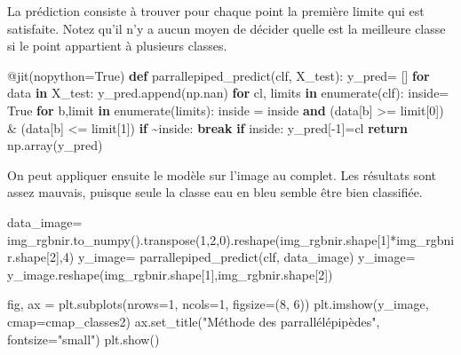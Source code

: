 \documentclass[
  11pt,
  letterpaper,
  open=any,
  twoside=false,
  french]{scrbook}
\newenvironment{Shaded}{\begin{snugshade}}{\end{snugshade}}
\newcommand{\AttributeTok}[1]{\textcolor[rgb]{0.40,0.45,0.13}{#1}}
\newcommand{\BuiltInTok}[1]{\textcolor[rgb]{0.00,0.23,0.31}{#1}}
\newcommand{\ControlFlowTok}[1]{\textcolor[rgb]{0.00,0.23,0.31}{\textbf{#1}}}
\newcommand{\DecValTok}[1]{\textcolor[rgb]{0.68,0.00,0.00}{#1}}
\newcommand{\KeywordTok}[1]{\textcolor[rgb]{0.00,0.23,0.31}{\textbf{#1}}}
\newcommand{\NormalTok}[1]{\textcolor[rgb]{0.00,0.23,0.31}{#1}}
\newcommand{\OperatorTok}[1]{\textcolor[rgb]{0.37,0.37,0.37}{#1}}
\newcommand{\StringTok}[1]{\textcolor[rgb]{0.13,0.47,0.30}{#1}}
\newcommand{\VariableTok}[1]{\textcolor[rgb]{0.07,0.07,0.07}{#1}}
\begin{document}
La prédiction consiste à trouver pour chaque point la première limite
qui est satisfaite. Notez qu'il n'y a aucun moyen de décider quelle est
la meilleure classe si le point appartient à plusieurs classes.

\begin{Shaded}
\begin{Highlighting}[]
\AttributeTok{@jit}\NormalTok{(nopython}\OperatorTok{=}\VariableTok{True}\NormalTok{)}
\KeywordTok{def}\NormalTok{ parrallepiped\_predict(clf, X\_test):}
\NormalTok{  y\_pred}\OperatorTok{=}\NormalTok{ []}
  \ControlFlowTok{for}\NormalTok{ data }\KeywordTok{in}\NormalTok{ X\_test:}
\NormalTok{    y\_pred.append(np.nan)}
    \ControlFlowTok{for}\NormalTok{ cl, limits }\KeywordTok{in} \BuiltInTok{enumerate}\NormalTok{(clf):}
\NormalTok{      inside}\OperatorTok{=} \VariableTok{True}
      \ControlFlowTok{for}\NormalTok{ b,limit }\KeywordTok{in} \BuiltInTok{enumerate}\NormalTok{(limits):}
\NormalTok{        inside }\OperatorTok{=}\NormalTok{ inside }\KeywordTok{and}\NormalTok{ (data[b] }\OperatorTok{\textgreater{}=}\NormalTok{ limit[}\DecValTok{0}\NormalTok{]) }\OperatorTok{\&}\NormalTok{ (data[b] }\OperatorTok{\textless{}=}\NormalTok{ limit[}\DecValTok{1}\NormalTok{])}
        \ControlFlowTok{if} \OperatorTok{\textasciitilde{}}\NormalTok{inside:}
          \ControlFlowTok{break}
      \ControlFlowTok{if}\NormalTok{ inside:}
\NormalTok{        y\_pred[}\OperatorTok{{-}}\DecValTok{1}\NormalTok{]}\OperatorTok{=}\NormalTok{cl}
  \ControlFlowTok{return}\NormalTok{ np.array(y\_pred)}
\end{Highlighting}
\end{Shaded}

On peut appliquer ensuite le modèle sur l'image au complet. Les
résultats sont assez mauvais, puisque seule la classe eau en bleu semble
être bien classifiée.

\begin{Shaded}
\begin{Highlighting}[]
\NormalTok{data\_image}\OperatorTok{=}\NormalTok{ img\_rgbnir.to\_numpy().transpose(}\DecValTok{1}\NormalTok{,}\DecValTok{2}\NormalTok{,}\DecValTok{0}\NormalTok{).reshape(img\_rgbnir.shape[}\DecValTok{1}\NormalTok{]}\OperatorTok{*}\NormalTok{img\_rgbnir.shape[}\DecValTok{2}\NormalTok{],}\DecValTok{4}\NormalTok{)}
\NormalTok{y\_image}\OperatorTok{=}\NormalTok{ parrallepiped\_predict(clf, data\_image)}
\NormalTok{y\_image}\OperatorTok{=}\NormalTok{ y\_image.reshape(img\_rgbnir.shape[}\DecValTok{1}\NormalTok{],img\_rgbnir.shape[}\DecValTok{2}\NormalTok{])}

\NormalTok{fig, ax }\OperatorTok{=}\NormalTok{ plt.subplots(nrows}\OperatorTok{=}\DecValTok{1}\NormalTok{, ncols}\OperatorTok{=}\DecValTok{1}\NormalTok{, figsize}\OperatorTok{=}\NormalTok{(}\DecValTok{8}\NormalTok{, }\DecValTok{6}\NormalTok{))}
\NormalTok{plt.imshow(y\_image, cmap}\OperatorTok{=}\NormalTok{cmap\_classes2)}
\NormalTok{ax.set\_title(}\StringTok{"Méthode des parrallélépipèdes"}\NormalTok{, fontsize}\OperatorTok{=}\StringTok{"small"}\NormalTok{)}
\NormalTok{plt.show()}
\end{Highlighting}
\end{Shaded}
\end{document}
